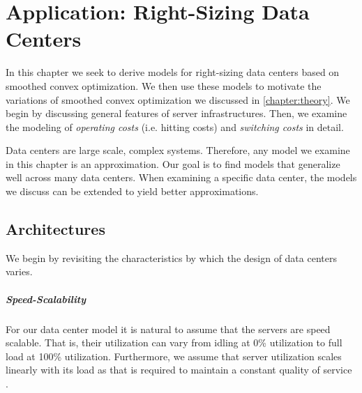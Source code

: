 
\chapter{Application: Right-Sizing Data Centers}\label{chapter:application}

In this chapter we seek to derive models for right-sizing data centers based on smoothed convex optimization. We then use these models to motivate the variations of smoothed convex optimization we discussed in \autoref{chapter:theory}. We begin by discussing general features of server infrastructures. Then, we examine the modeling of \textit{operating costs} (i.e. hitting costs) and \textit{switching costs} in detail.

Data centers are large scale, complex systems. Therefore, any model we examine in this chapter is an approximation. Our goal is to find models that generalize well across many data centers. When examining a specific data center, the models we discuss can be extended to yield better approximations.

\section{Architectures}\label{section:application:architectures}

We begin by revisiting the characteristics by which the design of data centers varies.

\paragraph{Speed-Scalability} For our data center model it is natural to assume that the servers are speed scalable. That is, their utilization can vary from idling at 0\% utilization to full load at 100\% utilization. Furthermore, we assume that server utilization scales linearly with its load as that is required to maintain a constant quality of service \cite{Bansal2015}.

